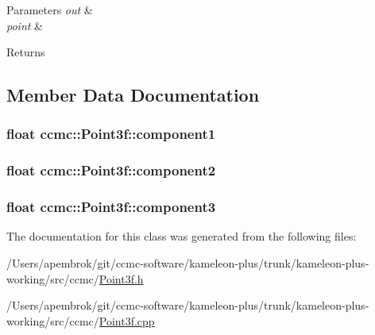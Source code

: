 \begin{DoxyParams}{Parameters}
{\em out} & \\
\hline
{\em point} & \\
\hline
\end{DoxyParams}
\begin{DoxyReturn}{Returns}

\end{DoxyReturn}


\subsection{Member Data Documentation}
\hypertarget{classccmc_1_1_point3f_a3e9b0696019ec1577083dc8d2918ea46}{
\subsubsection[{component1}]{\setlength{\rightskip}{0pt plus 5cm}float ccmc\-::\-Point3f\-::component1}}\label{classccmc_1_1_point3f_a3e9b0696019ec1577083dc8d2918ea46}
\hypertarget{classccmc_1_1_point3f_adc52014c3135cbf699d7785e901e18a3}{
\subsubsection[{component2}]{\setlength{\rightskip}{0pt plus 5cm}float ccmc\-::\-Point3f\-::component2}}\label{classccmc_1_1_point3f_adc52014c3135cbf699d7785e901e18a3}
\hypertarget{classccmc_1_1_point3f_a9f6adb1d63a8d54913c30e1b62b118fd}{
\subsubsection[{component3}]{\setlength{\rightskip}{0pt plus 5cm}float ccmc\-::\-Point3f\-::component3}}\label{classccmc_1_1_point3f_a9f6adb1d63a8d54913c30e1b62b118fd}


The documentation for this class was generated from the following files\-:\begin{DoxyCompactItemize}
\item 
/\-Users/apembrok/git/ccmc-\/software/kameleon-\/plus/trunk/kameleon-\/plus-\/working/src/ccmc/\hyperlink{_point3f_8h}{Point3f.\-h}\item 
/\-Users/apembrok/git/ccmc-\/software/kameleon-\/plus/trunk/kameleon-\/plus-\/working/src/ccmc/\hyperlink{_point3f_8cpp}{Point3f.\-cpp}\end{DoxyCompactItemize}
